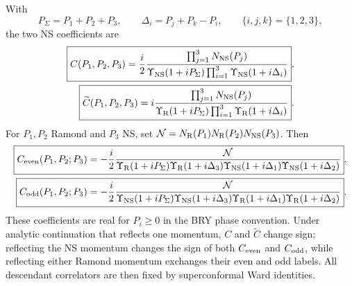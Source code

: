 \documentclass[11pt]{article}
\begin{document}
With
\begin{equation}
 P_\Sigma=P_1+P_2+P_3,
 \qquad
 \Delta_i=P_j+P_k-P_i,
 \qquad \{i,j,k\}=\{1,2,3\},
 \label{eq:three-point-momentum-combinations}
\end{equation}
the two NS coefficients are
\begin{align}
 \boxed{
 C(P_1,P_2,P_3)
 =\frac{i}{2}
 \frac{\prod_{j=1}^3N_{\rm NS}(P_j)}
 {\Upsilon_{\rm NS}(1+iP_\Sigma)
  \prod_{i=1}^3\Upsilon_{\rm NS}(1+i\Delta_i)}} ,
 \label{eq:c-ns}\\
 \boxed{
 \widetilde C(P_1,P_2,P_3)
 =i
 \frac{\prod_{j=1}^3N_{\rm NS}(P_j)}
 {\Upsilon_{\rm R}(1+iP_\Sigma)
  \prod_{i=1}^3\Upsilon_{\rm R}(1+i\Delta_i)}} .
 \label{eq:ctilde-ns}
\end{align}
For $P_1,P_2$ Ramond and $P_3$ NS, set
$\mathcal N=N_{\rm R}(P_1)N_{\rm R}(P_2)N_{\rm NS}(P_3)$.  Then
\begin{align}
 \boxed{
 C_{\rm even}(P_1,P_2;P_3)
 =-\frac{i}{2}\frac{\mathcal N}{
 \Upsilon_{\rm R}(1+iP_\Sigma)
 \Upsilon_{\rm R}(1+i\Delta_3)
 \Upsilon_{\rm NS}(1+i\Delta_1)
 \Upsilon_{\rm NS}(1+i\Delta_2)}} ,
 \label{eq:c-even}\\
 \boxed{
 C_{\rm odd}(P_1,P_2;P_3)
 =-\frac{i}{2}\frac{\mathcal N}{
 \Upsilon_{\rm NS}(1+iP_\Sigma)
 \Upsilon_{\rm NS}(1+i\Delta_3)
 \Upsilon_{\rm R}(1+i\Delta_1)
 \Upsilon_{\rm R}(1+i\Delta_2)}} .
 \label{eq:c-odd}
\end{align}
These coefficients are real for $P_i\geq0$ in the BRY phase convention.
Under analytic continuation that reflects one momentum,
$C$ and $\widetilde C$ change sign; reflecting the NS momentum changes the
sign of both $C_{\rm even}$ and $C_{\rm odd}$, while reflecting either
Ramond momentum exchanges their even and odd labels.  All descendant
correlators are then fixed by superconformal Ward identities.
\end{document}
